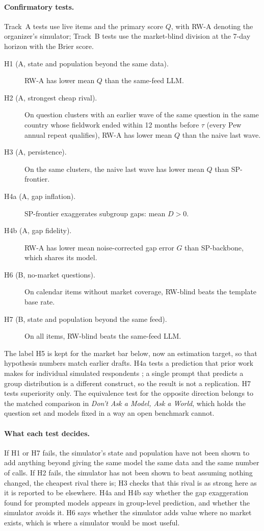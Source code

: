 \documentclass[11pt]{article}
\begin{document}
\paragraph{Confirmatory tests.} Track~A tests use live items and the primary score $Q$, with RW-A denoting the organizer's simulator; Track~B tests use the market-blind division at the 7-day horizon with the Brier score.
\begin{description}
  \item[H1 (A, state and population beyond the same data).] RW-A has lower mean $Q$ than the same-feed LLM.
  \item[H2 (A, strongest cheap rival).] On question clusters with an earlier wave of the same question in the same country whose fieldwork ended within 12 months before $\tau$ (every Pew annual repeat qualifies), RW-A has lower mean $Q$ than the naive last wave.
  \item[H3 (A, persistence).] On the same clusters, the naive last wave has lower mean $Q$ than SP-frontier.
  \item[H4a (A, gap inflation).] SP-frontier exaggerates subgroup gaps: mean $D > 0$.
  \item[H4b (A, gap fidelity).] RW-A has lower mean noise-corrected gap error $G$ than SP-backbone, which shares its model.
  \item[H6 (B, no-market questions).] On calendar items without market coverage, RW-blind beats the template base rate.
  \item[H7 (B, state and population beyond the same feed).] On all items, RW-blind beats the same-feed LLM.
\end{description}
The label H5 is kept for the market bar below, now an estimation target, so that hypothesis numbers match earlier drafts. H4a tests a prediction that prior work makes for individual simulated respondents \citep{chen2026synthetic}; a single prompt that predicts a group distribution is a different construct, so the result is not a replication. H7 tests superiority only. The equivalence test for the opposite direction belongs to the matched comparison in \emph{Don't Ask a Model, Ask a World}, which holds the question set and models fixed in a way an open benchmark cannot.

\paragraph{What each test decides.} If H1 or H7 fails, the simulator's state and population have not been shown to add anything beyond giving the same model the same data and the same number of calls. If H2 fails, the simulator has not been shown to beat assuming nothing changed, the cheapest rival there is; H3 checks that this rival is as strong here as it is reported to be elsewhere. H4a and H4b say whether the gap exaggeration found for prompted models appears in group-level prediction, and whether the simulator avoids it. H6 says whether the simulator adds value where no market exists, which is where a simulator would be most useful.
\end{document}
